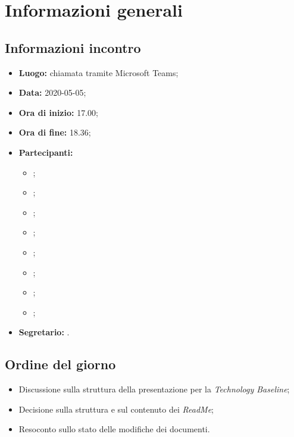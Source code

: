 \section{Informazioni generali}
\subsection{Informazioni incontro}
\begin{itemize}
	\item \textbf{Luogo:} chiamata tramite Microsoft Teams; 
	\item \textbf{Data:} 2020-05-05;
	\item \textbf{Ora di inizio:} 17.00; 
	\item \textbf{Ora di fine:} 18.36; 
	\item \textbf{Partecipanti:}
		\begin{itemize}
			\item \VB; 
			\item \LB; 
			\item \NF; 
			\item \EG; 
			\item \FJ; 
			\item \MP; 
			\item \AS; 
			\item \AZ; 
		\end{itemize}
	\item \textbf{Segretario:} \NF. 
\end{itemize}

\subsection{Ordine del giorno}
\begin{itemize}
	\item{Discussione sulla struttura della presentazione per la \textit{Technology Baseline}};
	\item{Decisione sulla struttura e sul contenuto dei \textit{ReadMe};}
	\item{Resoconto sullo stato delle modifiche dei documenti.}
\end{itemize}
